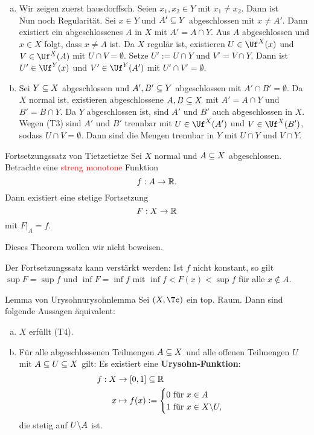 \begin{beweis}
\begin{enumerate}[(a)]
\item Wir zeigen zuerst hausdorffsch. Seien $x_1,x_2 \in Y$ mit $x_1 \neq x_2$. Dann ist \\
Nun noch Regularität. Sei $x \in Y$ und $A' \subseteq Y$ abgeschlossen mit $x \neq A'$. Dann existiert ein abgeschlossenes $A$ in $X$ mit $A' = A \cap Y$. Aus $A$ abgeschlossen und $x \in X$ folgt, dass $x \neq A$ ist. Da $X$ regulär ist, existieren $U \in \Uf^X(x)$ und $V \in \Uf^X(A)$ mit $U \cap V = \emptyset$. Setze $U':= U \cap Y$ und $V' = V\cap Y$. Dann ist $U' \in \Uf^Y(x)$ und $V' \in \Uf^Y(A')$ mit $U' \cap V' = \emptyset$.
\item Sei $Y \subseteq X$ abgeschlossen und $A', B' \subseteq Y$ abgeschlossen mit $A' \cap B' = \emptyset$. Da $X$ normal ist, existieren abgeschlossene $A,B \subseteq X$ mit $A' = A \cap Y$ und $B' = B \cap Y$. Da $Y$ abgeschlossen ist, sind $A'$ und $B'$ auch abgeschlossen in $X$. Wegen (T3) sind $A'$ und $B'$ trennbar mit $U \in \Uf^X(A')$ und $V \in \Uf^X(B')$, sodass $U \cap V = \emptyset$. Dann sind die Mengen trennbar in $Y$ mit $U \cap Y$ und $V \cap Y$.
\end{enumerate}
\end{beweis}
\begin{theorem}{Fortsetzungssatz von Tietze}{tietze}
Sei $X$ normal und $A \subseteq X$ abgeschlossen. Betrachte eine \textcolor{red}{streng monotone} Funktion
\begin{equation}
f: A \to \mathbb{R}.
\end{equation}
Dann existiert eine stetige Fortsetzung
\begin{equation}
F: X \to \mathbb{R}
\end{equation}
mit $F|_A = f$.
\end{theorem}
Dieses Theorem wollen wir nicht beweisen.
\begin{bemerkung}
Der Fortsetzungssatz kann verstärkt werden: Ist $f$ nicht konstant, so gilt $\sup F = \sup f$ und $\inf F = \inf f$ mit $\inf f < F(x) < \sup f$ für alle $x \notin A$.
\end{bemerkung}
\begin{theorem}{Lemma von Urysohn}{urysohnlemma}
Sei $(X,\Tc)$ ein top. Raum. Dann sind folgende Aussagen äquivalent:
\begin{enumerate}[(a)]
\item $X$ erfüllt (T4).
\item Für alle abgeschlossenen Teilmengen $A \subseteq X$ und alle offenen Teilmengen $U$ mit $A \subseteq U \subseteq X$ gilt: Es existiert eine \textbf{Urysohn-Funktion}:
\begin{equation}
\begin{split}
f: X &\to [0,1] \sub \R \\
x &\mapsto f(x):=\begin{cases} 0 \ \text{für} \ x \in A \\ 1 \ \text{für} \ x \in X \exc U ,\end{cases}
\end{split}
\end{equation}
die stetig auf $U \backslash A$ ist.
\end{enumerate}
\end{theorem}
